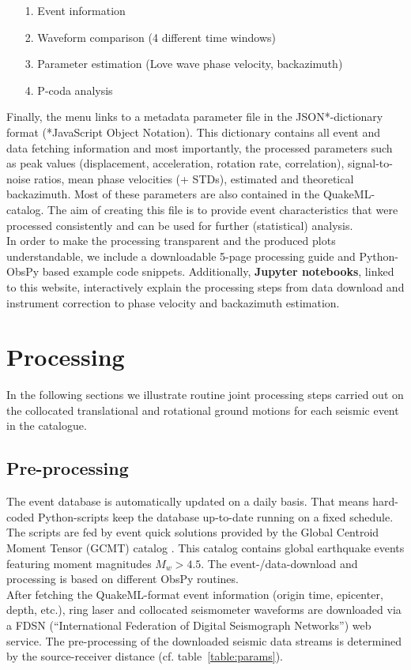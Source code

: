 \documentclass[12pt,reqno,letter]{article}
\begin{document}
\begin{itemize}
	\item[1.] Event information
	\item[2.] Waveform comparison (4 different time windows)
	\item[3.] Parameter estimation (Love wave phase velocity, backazimuth)
	\item[4.] P-coda analysis
\end{itemize}

Finally, the menu links to a metadata parameter file in the JSON*-dictionary format (*JavaScript Object Notation). This dictionary contains all event and data fetching information and most importantly, the processed parameters such as  peak values (displacement, acceleration, rotation rate, correlation), signal-to-noise ratios, mean phase velocities (+ STDs), estimated and theoretical backazimuth. Most of these parameters are also contained in the QuakeML-catalog.
The aim of creating this file is to  provide event characteristics that were processed consistently and can be used for further (statistical) analysis.\\
In order to make the processing transparent and the produced plots understandable, we include a downloadable 5-page processing guide  and Python-ObsPy based example code snippets. Additionally, \textbf{Jupyter notebooks}, linked to this website, interactively explain the processing steps from data download and instrument correction to phase velocity and backazimuth estimation.
%
%
\section*{Processing}
In the following sections we illustrate routine joint processing steps carried out on the collocated translational and rotational ground motions for each seismic event in the catalogue. 

\label{sec:processing}
\subsection*{Pre-processing}
The event database is automatically updated on a daily basis. That means hard-coded Python-scripts keep the database up-to-date running on a fixed schedule. The scripts are fed by event quick solutions provided by the Global Centroid Moment Tensor (GCMT) catalog \citep{Dziewonski1981, Ekstroem2012}. This catalog contains global earthquake events featuring moment magnitudes $M_w > 4.5$. The event-/data-download and processing is based on different ObsPy routines.\\
After fetching the QuakeML-format event information (origin time, epicenter, depth, etc.), ring laser and collocated seismometer waveforms are downloaded via a FDSN (“International Federation of Digital Seismograph Networks”) web service.
The pre-processing of the downloaded seismic data streams is determined by the source-receiver distance (cf. table~\ref{table:params}).
\end{document}

